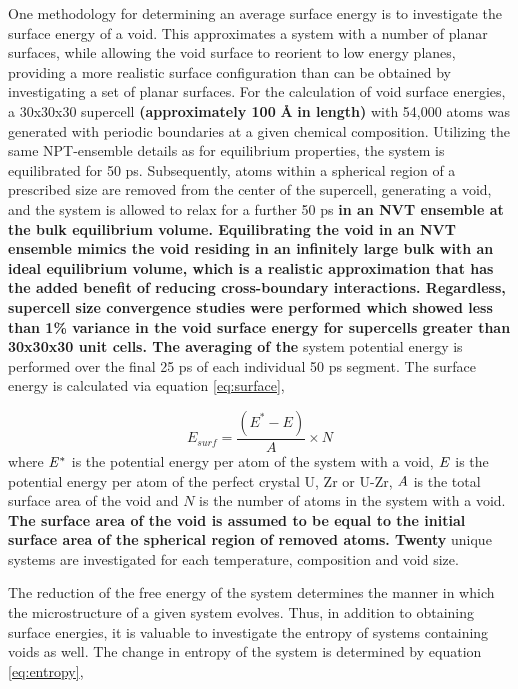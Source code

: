 \documentclass[review]{elsarticle}
\providecommand{\DIFaddtex}[1]{{\bf #1}} %
\providecommand{\DIFdeltex}[1]{} %
\providecommand{\DIFaddbegin}{\protect\color{blue}} %
\providecommand{\DIFaddend}{\protect\color{black}} %
\providecommand{\DIFdelbegin}{\protect\color{red}} %
\providecommand{\DIFdelend}{\protect\color{black}} %
\providecommand{\DIFadd}[1]{\texorpdfstring{\DIFaddtex{#1}}{#1}} %
\providecommand{\DIFdel}[1]{\texorpdfstring{\DIFdeltex{#1}}{}} %
\newcommand{\DIFscaledelfig}{0.5}
\newlength{\DIFdelgraphicswidth} %
\newlength{\DIFdelgraphicsheight} %
\newcommand{\DIFaddincludegraphics}[2][]{{\color{blue}\fbox{\DIFOincludegraphics[#1]{#2}}}} %
\newcommand{\DIFdelincludegraphics}[2][]{%
\sbox{\DIFdelgraphicsbox}{\DIFOincludegraphics[#1]{#2}}%
\settoboxwidth{\DIFdelgraphicswidth}{\DIFdelgraphicsbox} %
\settoboxtotalheight{\DIFdelgraphicsheight}{\DIFdelgraphicsbox} %
\scalebox{\DIFscaledelfig}{%
\parbox[b]{\DIFdelgraphicswidth}{\usebox{\DIFdelgraphicsbox}\\[-\baselineskip] \rule{\DIFdelgraphicswidth}{0em}}\llap{\resizebox{\DIFdelgraphicswidth}{\DIFdelgraphicsheight}{%
\setlength{\unitlength}{\DIFdelgraphicswidth}%
\begin{picture}(1,1)%
\thicklines\linethickness{2pt} %
{\color[rgb]{1,0,0}\put(0,0){\framebox(1,1){}}}%
{\color[rgb]{1,0,0}\put(0,0){\line( 1,1){1}}}%
{\color[rgb]{1,0,0}\put(0,1){\line(1,-1){1}}}%
\end{picture}%
}\hspace*{3pt}}} %
} %
\DeclareRobustCommand{\DIFaddbegin}{\DIFOaddbegin \let\includegraphics\DIFaddincludegraphics} %
\DeclareRobustCommand{\DIFaddend}{\DIFOaddend \let\includegraphics\DIFOincludegraphics} %
\DeclareRobustCommand{\DIFdelbegin}{\DIFOdelbegin \let\includegraphics\DIFdelincludegraphics} %
\DeclareRobustCommand{\DIFdelend}{\DIFOaddend \let\includegraphics\DIFOincludegraphics} %
\begin{document}
\DIFaddend One methodology for determining an average surface energy is to investigate the surface energy of a void. This approximates a system with a number of planar surfaces, while allowing the void surface to reorient to low energy planes, providing a more realistic surface configuration than can be obtained by investigating a set of planar surfaces. For the calculation of void surface energies, a 30x30x30 supercell \DIFaddbegin \DIFadd{(approximately 100 }{\DIFadd{\AA}} \DIFadd{in length) }\DIFaddend with 54,000 atoms was generated with periodic boundaries at a given chemical composition. Utilizing the same NPT-ensemble details as for equilibrium properties, the system is equilibrated for 50 ps. Subsequently, atoms within a spherical region of a prescribed size are removed from the center of the supercell, generating a void, and the system is allowed to relax for a further 50 ps \DIFdelbegin \DIFdel{. Averaging of the }\DIFdelend \DIFaddbegin \DIFadd{in an NVT ensemble at the bulk equilibrium volume. Equilibrating the void in an NVT ensemble mimics the void residing in an infinitely large bulk with an ideal equilibrium volume, which is a realistic approximation that has the added benefit of reducing cross-boundary interactions. Regardless, supercell size convergence studies were performed which showed less than 1\% variance in the void surface energy for supercells greater than 30x30x30 unit cells. The averaging of the }\DIFaddend system potential energy is performed over the final 25 ps of each individual 50 ps segment. The surface energy is calculated via equation \ref{eq:surface},

\begin{equation}
\label{eq:surface}
E_{surf}= \frac{(E^{*} - E)}{A} \times N
\end{equation} where $\it{E^{*}}$ is the potential energy per atom of the system with a void, $\it{E}$ is the potential energy per atom of the perfect crystal U, Zr or U-Zr, $\it{A}$ is the total surface area of the void and $\textit{N}$ is the number of atoms in the system with a void. \DIFdelbegin \DIFdel{Five }\DIFdelend \DIFaddbegin \DIFadd{The surface area of the void is assumed to be equal to the initial surface area of the spherical region of removed atoms. Twenty }\DIFaddend unique systems are investigated for each temperature, composition and void size.

The reduction of the free energy of the system determines the manner in which the microstructure of a given system evolves. Thus, in addition to obtaining surface energies, it is valuable to investigate the entropy of systems containing voids as well. The change in entropy of the system is determined by equation \ref{eq:entropy},
\end{document}

